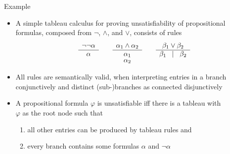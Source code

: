 \begin{frame}{Example}
  \begin{itemize}
  \item<1-> A simple tableau calculus for proving unsatisfiability of propositional
    formulas, composed from $\neg$, $\wedge$, and $\vee$, consists of rules
    \[
    \begin{array}[t]{c}
      \neg\neg \alpha\\
      \hline
      \alpha
    \end{array}
    \qquad
    \begin{array}[t]{c}
      \alpha_1 \wedge \alpha_2 \\
      \hline
      \alpha_1\\[-1mm]
      \alpha_2
    \end{array}
    \qquad
    \begin{array}[t]{c}
      \beta_1 \vee \beta_2 \\
      \hline
      \beta_1 \;\; \mid \;\; \beta_2
    \end{array}
    \]
  \item<2-> All rules are semantically valid, when interpreting entries in a branch conjunctively and distinct (sub-)branches as connected disjunctively
  \item<3->
    A propositional formula $\varphi$ %
    is unsatisfiable iff
    there is a tableau with\\ $\varphi$ as the root node such that
    \begin{enumerate}
    \item all other entries can be produced by tableau rules and
    \item every branch contains some formulas $\alpha$ and $\neg\alpha$
    \end{enumerate}
  \end{itemize}
\end{frame}
